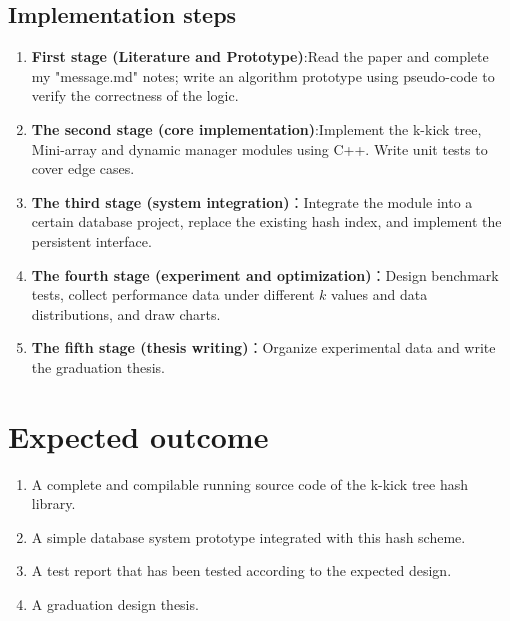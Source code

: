 \documentclass[a4paper,12pt]{ctexart}
\begin{document}
\subsection{Implementation steps}
\begin{enumerate}
    \item \textbf{First stage (Literature and Prototype)}:Read the paper and complete my "message.md" notes; write an algorithm prototype using pseudo-code to verify the correctness of the logic.
    \item \textbf{The second stage (core implementation)}:Implement the k-kick tree, Mini-array and dynamic manager modules using C++. Write unit tests to cover edge cases.
    \item \textbf{The third stage (system integration)}：Integrate the module into a certain database project, replace the existing hash index, and implement the persistent interface.
    \item \textbf{The fourth stage (experiment and optimization)}：Design benchmark tests, collect performance data under different $k$ values and data distributions, and draw charts.
    \item \textbf{The fifth stage (thesis writing)}：Organize experimental data and write the graduation thesis.
\end{enumerate}

\section{Expected outcome}
\begin{enumerate}
    \item A complete and compilable running source code of the k-kick tree hash library.
    \item A simple database system prototype integrated with this hash scheme.
    \item A test report that has been tested according to the expected design.
    \item A graduation design thesis.
\end{enumerate}
\end{document}
